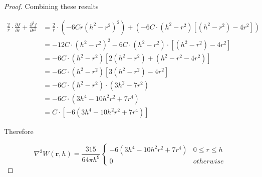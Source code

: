 \documentclass[a4paper, 12pt]{article}
\begin{document}
\begin{proof}
        Combining these results

        \begin{align*}
            \frac{2}{r} \cdot \frac{\partial f}{\partial r} + \frac{\partial^2 f}{\partial r^2}
            &= \frac{2}{r} \cdot \left(-6Cr(h^2 - r^2)^2\right) + \left(-6C \cdot (h^2 - r^2)\left[(h^2 - r^2) - 4r^2\right]\right) \\
            &= -12C \cdot (h^2 - r^2)^2 -6C \cdot (h^2 - r^2) \cdot \left[(h^2 - r^2) - 4r^2\right] \\
            &= -6C \cdot (h^2 - r^2) \left[2(h^2 - r^2) + (h^2 - r^2 - 4r^2)\right] \\
            &= -6C \cdot (h^2 - r^2) \left[3(h^2 - r^2) - 4r^2\right] \\
            &= -6C \cdot (h^2 - r^2) \cdot (3h^2 - 7r^2) \\
            &= -6C \cdot (3h^4 - 10h^2r^2 + 7r^4) \\
            &= C \cdot \left[-6(3h^4 - 10h^2r^2 + 7r^4)\right]
        \end{align*}

        Therefore

        $$\nabla^2 W(\textbf{r}, h) = \frac{315}{64\pi{h}^9}
        \begin{cases}
            -6(3h^4 - 10h^2r^2 + 7r^4) & 0 \leq r \leq h \\
            0 & otherwise
        \end{cases}$$
    \end{proof}
\end{document}
